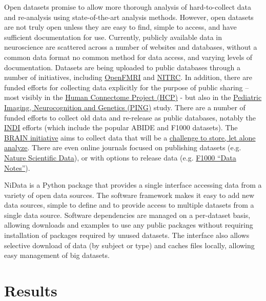\documentclass[twocolumn]{bmcart}%
\begin{document}
Open datasets promise to allow more thorough analysis of hard-to-collect
data and re-analysis using state-of-the-art analysis methods. However,
open datasets are not truly open unless they are easy to find, simple to
access, and have sufficient documentation for use. Currently, publicly
available data in neuroscience are scattered across a number of websites
and databases, without a common data format no common method for data
access, and varying levels of documentation. Datasets are being uploaded
to public databases through a number of initiatives, including
\href{http://www.openfmri.org/}{OpenFMRI} and
\href{http://www.nitrc.org}{NITRC}. In addition, there are funded
efforts for collecting data explicitly for the purpose of public sharing
-- most visibly in the \href{http://www.humanconnectome.org/}{Human
Connectome Project (HCP)} - but also in the
\href{http://pingstudy.ucsd.edu/}{Pediatric Imaging, Neurocognition and
Genetics (PING)} study. There are a number of funded efforts to collect
old data and re-release as public databases, notably the
\href{http://fcon_1000.projects.nitrc.org/indi/IndiRetro.html}{INDI}\cite{Mennes2013}
efforts (which include the popular ABIDE and F1000 datasets). The
\href{http://braininitiative.nih.gov/}{BRAIN initiative} aims to collect
data that will be a
\href{http://www.brainupdate.nih.gov/calling-all-statisticians/}{challenge
to store, let alone analyze}. There are even online journals focused on
publishing datasets (e.g. \href{http://www.nature.com/sdata/}{Nature
Scientific Data}), or with options to release data (e.g.
\href{http://f1000research.com/articles?tab=ALL\&articleTypes=DATA_NOTE\&subjectArea=396}{F1000
``Data Notes''}).

NiData is a Python package that provides a single interface accessing
data from a variety of open data sources. The software framework makes
it easy to add new data sources, simple to define and to provide access
to multiple datasets from a single data source. Software dependencies
are managed on a per-dataset basis, allowing downloads and examples to
use any public packages without requiring installation of packages
required by unused datasets. The interface also allows selective
download of data (by subject or type) and caches files locally, allowing
easy management of big datasets.

\section{Results}\label{results}
\end{document}
